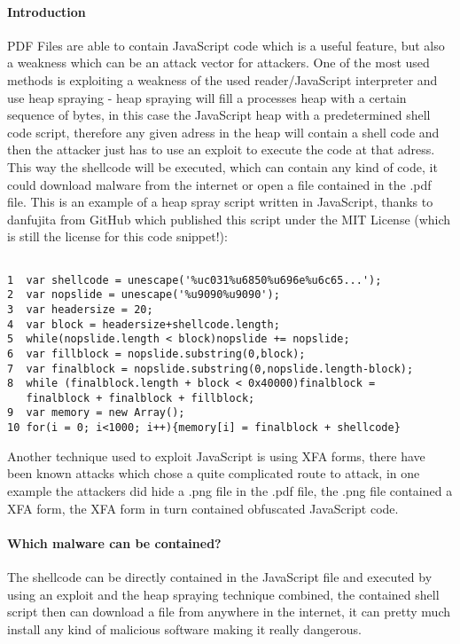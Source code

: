 \documentclass[a4paper,10pt]{article}
\begin{document}
\paragraph*{Introduction}
PDF Files are able to contain JavaScript code which is a useful feature, but also a weakness which can be an attack vector for attackers.
One of the most used methods is exploiting a weakness of the used reader/JavaScript interpreter and use heap spraying\cite{stevens} - heap spraying will fill a processes heap with a certain sequence of bytes, in this case the JavaScript heap with a predetermined shell code script, therefore any given adress in the heap will contain a shell code and then the attacker just has to use an exploit to execute the code at that adress. This way the shellcode will be executed, which can contain any kind of code, it could download malware from the internet or open a file contained in the .pdf file.
This is an example of a heap spray script written in JavaScript, thanks to danfujita from GitHub\cite{danfujita_2016} which published this script under the MIT License (which is still the license for this code snippet!):
\begin{footnotesize}


\begin{lstlisting}

1  var shellcode = unescape('%uc031%u6850%u696e%u6c65...');       
2  var nopslide = unescape('%u9090%u9090');
3  var headersize = 20;
4  var block = headersize+shellcode.length;
5  while(nopslide.length < block)nopslide += nopslide;
6  var fillblock = nopslide.substring(0,block);
7  var finalblock = nopslide.substring(0,nopslide.length-block);  
8  while (finalblock.length + block < 0x40000)finalblock =
   finalblock + finalblock + fillblock;
9  var memory = new Array();
10 for(i = 0; i<1000; i++){memory[i] = finalblock + shellcode}	
\end{lstlisting}
\end{footnotesize}

Another technique used to exploit JavaScript is using XFA forms, there have been known attacks which chose a quite complicated route to attack, in one example the attackers did hide a .png file in the .pdf file, the .png file contained a XFA form, the XFA form in turn contained obfuscated JavaScript code.\cite{cyren}
\paragraph{Which malware can be contained?}
The shellcode can be directly contained in the JavaScript file and executed by using an exploit and the heap spraying technique combined, the contained shell script then can download a file from anywhere in the internet, it can pretty much install any kind of malicious software making it really dangerous.
\end{document}
